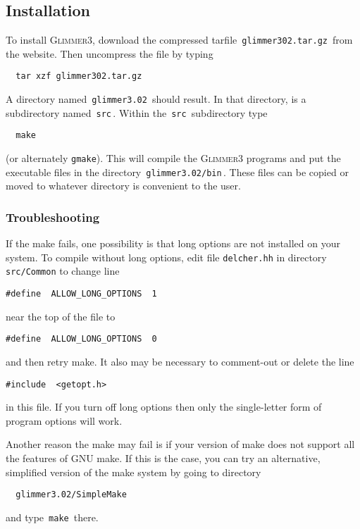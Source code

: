 \documentclass[fleqn,titlepage,11pt]{article}
\def\Gthree{\textsc{Glimmer3}}
\def\Pg#1{\texttt{#1}}
\begin{document}
\subsection{Installation}
To install \Gthree{}, download the compressed tarfile
\,\verb`glimmer302.tar.gz`\,
from the website.  Then uncompress the file by typing
\BSV\begin{verbatim}
  tar xzf glimmer302.tar.gz
\end{verbatim}\ESV
A directory named \,\verb`glimmer3.02`\, should result.
In that directory, is a subdirectory named \,\verb`src`\,.
Within the \,\verb`src`\, subdirectory type
\BSV\begin{verbatim}
  make
\end{verbatim}\ESV
(or alternately \Pg{gmake}).
This will compile the \Gthree{} programs and put
the executable files in the directory \,\verb`glimmer3.02/bin`\,.
These files can be copied or moved to whatever directory
is convenient to the user.

\subsubsection{Troubleshooting}
If the make fails, one possibility is that long options are
not installed on your system.  To compile without long options,
edit file \Pg{delcher.hh} in directory \Pg{src/Common}
to change line
\BSV\begin{verbatim}
#define  ALLOW_LONG_OPTIONS  1
\end{verbatim}\ESV
near the top of the file to
\BSV\begin{verbatim}
#define  ALLOW_LONG_OPTIONS  0
\end{verbatim}\ESV
and then retry make.  It also may be necessary to comment-out
or delete the line
\BSV\begin{verbatim}
#include  <getopt.h>
\end{verbatim}\ESV
in this file.  If you turn off long options then only the single-letter
form of program options will work.

Another reason the make may fail is if your version of make
does not support all the features of GNU make.  If this is the
case, you can try an alternative, simplified version of the make
system by going to directory
\BSV\begin{verbatim}
  glimmer3.02/SimpleMake
\end{verbatim}\ESV
and type \,\verb`make`\, there.
\end{document}
